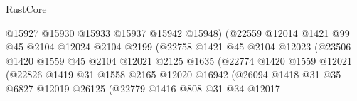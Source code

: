 \begin{lexlean}{RustCore}
\begin{coremodule}
                                        @15927
                                        @15930
                                        @15933
                                        @15937
                                        @15942
                                        @15948)
                                      (@22559
                                        @12014
                                        @1421
                                        @99
                                        @45
                                        @2104
                                        @12024
                                        @2104
                                        @2199
                                        (@22758
                                          @1421
                                          @45
                                          @2104
                                          @12023
                                          (@23506
                                            @1420
                                            @1559
                                            @45
                                            @2104
                                            @12021
                                            @2125
                                            @1635
                                            (@22774
                                              @1420
                                              @1559
                                              @12021
                                              (@22826
                                                @1419
                                                @31
                                                @1558
                                                @2165
                                                @12020
                                                @16942
                                                (@26094
                                                  @1418
                                                  @31
                                                  @35
                                                  @6827
                                                  @12019
                                                  @26125
                                                  (@22779
                                                    @1416
                                                    @808
                                                    @31
                                                    @34
                                                    @12017

\end{coremodule}
\end{lexlean}
